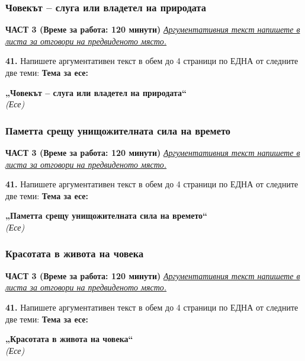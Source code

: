 \documentclass[12pt,a4paper]{article}
\begin{document}
\subsubsection{Човекът – слуга или владетел на природата}
\vspace{0.5cm}
\begin{center}
\textbf{ЧАСТ 3 (Време за работа: 120 минути)}
\vspace{0.2cm}
{\textit{\underline{Аргументативния текст напишете в листа за отговори на предвиденото място.}}}
\vspace{0.1cm}
\end{center}
\textbf{41.} Напишете аргументативен текст в обем до 4 страници по ЕДНА от следните две теми:
\vspace{0.2cm}
\textbf{Тема за есе:}
\vspace{0.1cm}
\begin{center}
\textbf{„Човекът – слуга или владетел на природата“}
\\
\textit{(Есе)}
\end{center}

\subsubsection{Паметта срещу унищожителната сила на времето}
\vspace{0.5cm}
\begin{center}
\textbf{ЧАСТ 3 (Време за работа: 120 минути)}
\vspace{0.2cm}
{\textit{\underline{Аргументативния текст напишете в листа за отговори на предвиденото място.}}}
\vspace{0.1cm}
\end{center}
\textbf{41.} Напишете аргументативен текст в обем до 4 страници по ЕДНА от следните две теми:
\vspace{0.2cm}
\textbf{Тема за есе:}
\vspace{0.1cm}
\begin{center}
\textbf{„Паметта срещу унищожителната сила на времето“}
\\
\textit{(Есе)}
\end{center}

\subsubsection{Красотата в живота на човека}
\vspace{0.5cm}
\begin{center}
\textbf{ЧАСТ 3 (Време за работа: 120 минути)}
\vspace{0.2cm}
{\textit{\underline{Аргументативния текст напишете в листа за отговори на предвиденото място.}}}
\vspace{0.1cm}
\end{center}
\textbf{41.} Напишете аргументативен текст в обем до 4 страници по ЕДНА от следните две теми:
\vspace{0.2cm}
\textbf{Тема за есе:}
\vspace{0.1cm}
\begin{center}
\textbf{„Красотата в живота на човека“}
\\
\textit{(Есе)}
\end{center}
\end{document}
